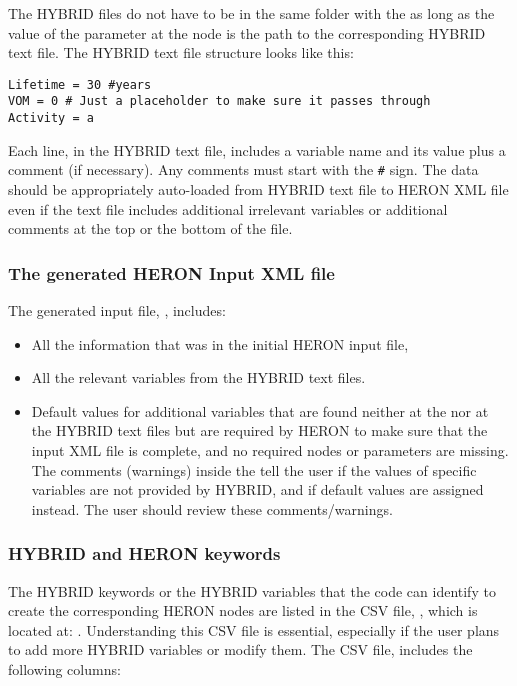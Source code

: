 The HYBRID files do not have to be in the same folder with the  as long as the value of the  parameter at the  node is the path to the corresponding HYBRID text file. The HYBRID text file structure looks like this:
\begin{lstlisting}
Lifetime = 30 #years
VOM = 0 # Just a placeholder to make sure it passes through
Activity = a
\end{lstlisting}

Each line, in the HYBRID text file, includes a variable name and its value plus a comment (if necessary). Any comments must start with the \verb|#| sign. The data should be appropriately auto-loaded from HYBRID text file to HERON XML file even if the text file includes additional irrelevant variables or additional comments at the top or the bottom of the file.

\subsubsection{The generated HERON Input XML file}
The generated input file, , includes:
\begin{itemize}
\item All the information that was in the initial HERON input file,       
\item All the relevant variables from the HYBRID text files.
\item Default values for additional variables that are found neither at the  nor at the HYBRID text files but are required by HERON to make sure that the input XML file is complete, and no required nodes or parameters are missing. The comments (warnings) inside the  tell the user if the values of specific variables are not provided by HYBRID, and if default values are assigned instead. The user should review these comments/warnings.
\end{itemize}

\subsubsection{HYBRID and HERON keywords}
The HYBRID keywords or the HYBRID variables that the  code can identify to create the corresponding HERON nodes are listed in the CSV file, , which is located at: . Understanding this CSV file is essential, especially if the user plans to add more HYBRID variables or modify them. The CSV file,  includes the following columns:


